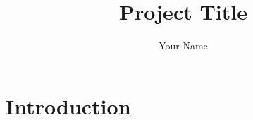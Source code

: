 \documentclass{article}
\title{Project Title}
\author{Your Name}
\begin{document}
\maketitle
\section{Introduction}
\end{document}
